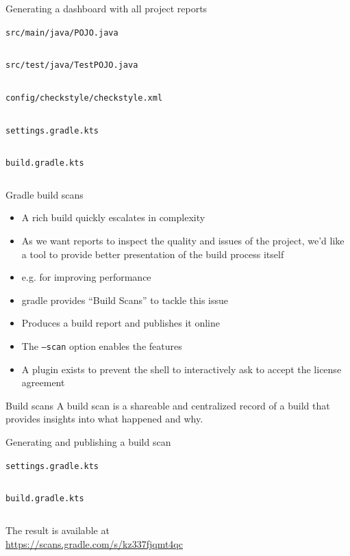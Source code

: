 \documentclass[presentation]{beamer}
\newcommand{\codefile}[4]{
	\begin{block}{\texttt{#2}}
		\inputminted[fontsize=#3,linenos=true,breaklines=true]{#4}{"workspace/#1/#2"}
	\end{block}
}
\newcommand{\java}[3]{\codefile{#1}{#2}{#3}{java}}
\newcommand{\kotlin}[3]{\codefile{#1}{#2}{#3}{kotlin}}
\newcommand{\tinier}{\fontsize{4pt}{5pt}\selectfont}
\begin{document}
\begin{frame}{Generating a dashboard with all project reports}
    \java{21-Dashboard}{src/main/java/POJO.java}{\tinier}
    \java{21-Dashboard}{src/test/java/TestPOJO.java}{\tinier}
    \begin{block}{\texttt{config/checkstyle/checkstyle.xml}}
        \inputminted[fontsize=\tiny,linenos=true,breaklines=true,firstline=1,lastline=24]{xml}{workspace/21-Dashboard/config/checkstyle/checkstyle.xml}
    \end{block}
    \kotlin{21-Dashboard}{settings.gradle.kts}{\normalsize}
    \kotlin{21-Dashboard}{build.gradle.kts}{\scriptsize}
\end{frame}

\begin{frame}[fragile]{Gradle build scans}
    \begin{itemize}
        \item A rich build quickly escalates in complexity
        \item As we want reports to inspect the quality and issues of the project, we'd like a tool to provide better presentation of the build process itself
        \item e.g. for improving performance
        \item gradle provides ``Build Scans'' to tackle this issue
        \item Produces a build report and publishes it online
        \item The \texttt{--scan} option enables the features
        \item A plugin exists to prevent the shell to interactively ask to accept the license agreement
    \end{itemize}
    \begin{block}{Build scans}
        A build scan is a shareable and centralized record of a build that provides insights into what happened and why.
    \end{block}
\end{frame}

\begin{frame}{Generating and publishing a build scan}
    \kotlin{22-Scans}{settings.gradle.kts}{\normalsize}
    \kotlin{22-Scans}{build.gradle.kts}{\scriptsize}
    \begin{block}{}
        The result is available at\\ \url{https://scans.gradle.com/s/kz337fjqmt4qc}
    \end{block}
\end{frame}
\end{document}
